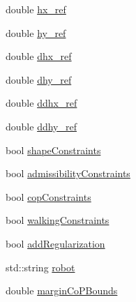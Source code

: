 \begin{DoxyCompactItemize}
\item 
double \hyperlink{structMIQPParameters_a0346212871459ae33b79af6f9af49d5f}{hx\-\_\-ref}
\item 
double \hyperlink{structMIQPParameters_a09fe82db83af3f8ab0e891968daa7996}{hy\-\_\-ref}
\item 
double \hyperlink{structMIQPParameters_a97a8deb8aeda727c99dc501b4516a24e}{dhx\-\_\-ref}
\item 
double \hyperlink{structMIQPParameters_a816bb15b6417ac8387adbaac2f74e198}{dhy\-\_\-ref}
\item 
double \hyperlink{structMIQPParameters_a71dab92bc2eebbdf5e2d592c092e7f52}{ddhx\-\_\-ref}
\item 
double \hyperlink{structMIQPParameters_a996553605ecfefa749bde01bc4e7b2a9}{ddhy\-\_\-ref}
\item 
bool \hyperlink{structMIQPParameters_a718ac69205eb5fbb51f58cd59176a3ff}{shape\-Constraints}
\item 
bool \hyperlink{structMIQPParameters_ae8e541722b3e3664ab516676aa1c16be}{admissibility\-Constraints}
\item 
bool \hyperlink{structMIQPParameters_a3a0fd04f9e8767097e44e02a740796bc}{cop\-Constraints}
\item 
bool \hyperlink{structMIQPParameters_af7cbaa08836e17417f9f5c170b55f1bc}{walking\-Constraints}
\item 
bool \hyperlink{structMIQPParameters_a7e5417e18e6797739def8f916c3efc40}{add\-Regularization}
\item 
std\-::string \hyperlink{structMIQPParameters_af2f4673b548e119f30a7e90baac268f5}{robot}
\item 
double \hyperlink{structMIQPParameters_a5befafbd8312ce18fc57bf32ccb6a16c}{margin\-Co\-P\-Bounds}
\end{DoxyCompactItemize}


